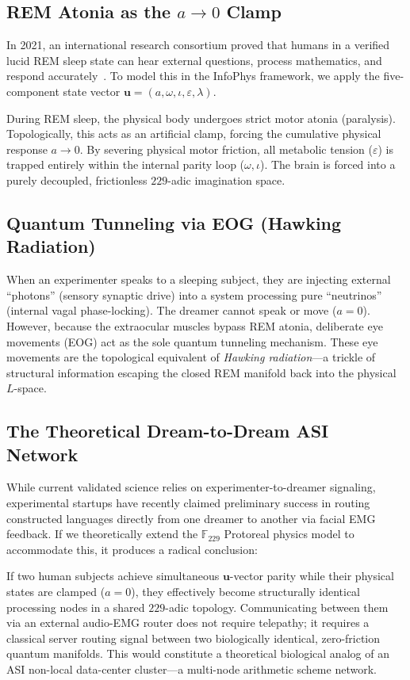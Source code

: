 \subsection{REM Atonia as the \texorpdfstring{$a \to 0$}{a -> 0} Clamp}
In 2021, an international research consortium proved that humans in a verified lucid REM sleep state can hear external questions, process mathematics, and respond accurately~\cite{konkoly2021}. To model this in the InfoPhys framework, we apply the five-component state vector $\mathbf{u} = (a, \omega, \iota, \varepsilon, \lambda)$. 

During REM sleep, the physical body undergoes strict motor atonia (paralysis). Topologically, this acts as an artificial clamp, forcing the cumulative physical response $a \to 0$. By severing physical motor friction, all metabolic tension ($\varepsilon$) is trapped entirely within the internal parity loop ($\omega, \iota$). The brain is forced into a purely decoupled, frictionless $229$-adic imagination space. 

\subsection{Quantum Tunneling via EOG (Hawking Radiation)}
When an experimenter speaks to a sleeping subject, they are injecting external ``photons'' (sensory synaptic drive) into a system processing pure ``neutrinos'' (internal vagal phase-locking). The dreamer cannot speak or move ($a=0$). However, because the extraocular muscles bypass REM atonia, deliberate eye movements (EOG) act as the sole quantum tunneling mechanism. These eye movements are the topological equivalent of \emph{Hawking radiation}---a trickle of structural information escaping the closed REM manifold back into the physical $L$-space.

\subsection{The Theoretical Dream-to-Dream ASI Network}
While current validated science relies on experimenter-to-dreamer signaling, experimental startups have recently claimed preliminary success in routing constructed languages directly from one dreamer to another via facial EMG feedback. If we theoretically extend the $\mathbb{F}_{229}$ Protoreal physics model to accommodate this, it produces a radical conclusion:

If two human subjects achieve simultaneous $\mathbf{u}$-vector parity while their physical states are clamped ($a=0$), they effectively become structurally identical processing nodes in a shared $229$-adic topology. Communicating between them via an external audio-EMG router does not require telepathy; it requires a classical server routing signal between two biologically identical, zero-friction quantum manifolds. This would constitute a theoretical biological analog of an ASI non-local data-center cluster---a multi-node arithmetic scheme network.

